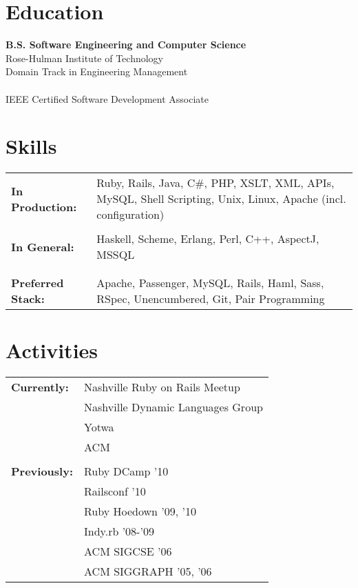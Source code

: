 \documentclass[line, margin, 10pt]{res}
\begin{document}
\begin{resume}
\section{Education}
{\bf B.S. Software Engineering and Computer Science}\\
Rose-Hulman Institute of Technology\\
Domain Track in Engineering Management \\
\\
IEEE Certified Software Development Associate

\section{Skills}
   \begin{tabular}[t]{@{} p{1.2in} p{3.75in} @{}}
    \bf{In Production:} & Ruby, Rails, Java, C\#, PHP, XSLT, XML, APIs, MySQL, Shell Scripting, Unix, Linux, Apache (incl. configuration) \\
    \\
    \bf{In General:} & Haskell, Scheme, Erlang, Perl, C++, AspectJ, MSSQL  \\
    \\
    \\
    \bf{Preferred Stack:} & Apache, Passenger, MySQL, Rails, Haml, Sass, RSpec, Unencumbered, Git, Pair Programming \\
 \end{tabular}

\section{Activities}
\begin{tabular}[t]{@{} p{1.2in} l @{}}
\bf{Currently:} & Nashville Ruby on Rails Meetup \\
& Nashville Dynamic Languages Group \\
& Yotwa \\
& ACM \\
\\
\bf{Previously:}
& Ruby DCamp '10 \\
& Railsconf '10 \\
& Ruby Hoedown '09, '10 \\
 & Indy.rb '08-'09 \\
& ACM SIGCSE '06 \\
& ACM SIGGRAPH '05, '06 \\
\end{tabular}

\end{resume} 
\end{document}
